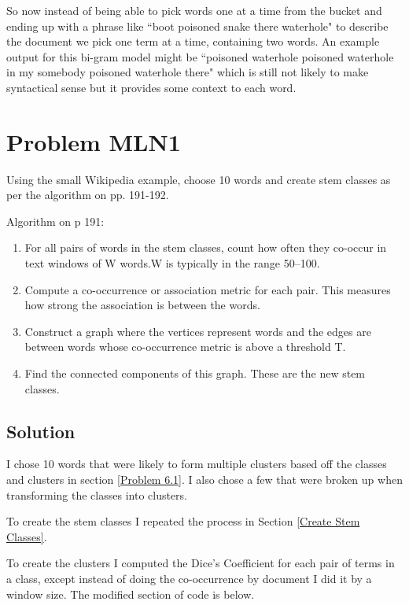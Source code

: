 \documentclass[letterpaper,12pt]{article}
\begin{document}
So now instead of being able to pick words one at a time from the bucket and ending up with a phrase like ``boot poisoned snake there waterhole" to describe the document we pick one term at a time, containing two words. An example output for this bi-gram model might be ``poisoned waterhole poisoned waterhole in my somebody poisoned waterhole there" which is still not likely to make syntactical sense but it provides some context to each word.

\pagebreak

\section{Problem MLN1}
Using the small Wikipedia example, choose 10 words and create stem classes as per the algorithm on pp. 191-192.

Algorithm on p 191:
\begin{enumerate}
  \item For all pairs of words in the stem classes, count how often they co-occur in text windows of W words.W is typically in the range 50–100.
  \item Compute a co-occurrence or association metric for each pair. This measures how strong the association is between the words.
  \item Construct a graph where the vertices represent words and the edges are between words whose co-occurrence metric is above a threshold T.
  \item Find the connected components of this graph. These are the new stem classes.
\end{enumerate}


\subsection{Solution}

I chose 10 words that were likely to form multiple clusters based off the classes and clusters in section \ref{Problem 6.1}. I also chose a few that were broken up when transforming the classes into clusters.

To create the stem classes I repeated the process in Section \ref{Create Stem Classes}.

To create the clusters I computed the Dice's Coefficient for each pair of terms in a class, except instead of doing the co-occurrence by document I did it by a window size. The modified section of code is below.
\end{document}
